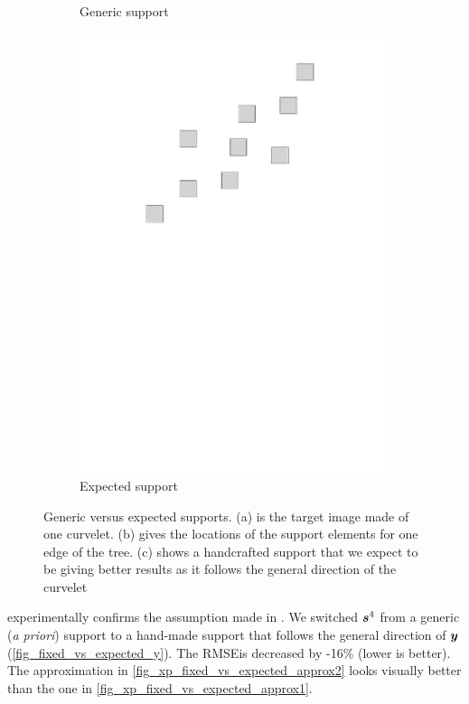 \begin{figure}[!ht]
\begin{subfigure}[b]{0.32\textwidth}
	\caption{Generic support}
\end{subfigure}
\begin{subfigure}[b]{0.32\textwidth}\centering
	\includegraphics[width=\textwidth]{figures/manual-better-support/support-better.pdf}
	\caption{Expected support}
\end{subfigure}
\caption{Generic versus expected supports. (a) is the target image made of one curvelet. (b) gives the locations of the support elements for one edge of the tree. (c) shows a handcrafted support that we expect to be giving better results as it follows the general direction of the curvelet}\label{fig_fixed_vs_expected}
\end{figure}

 experimentally confirms the assumption made in . We switched $\bm{s}^4$ from a generic (\textit{a priori}) support to a hand-made support that follows the general direction of $\bm{y}$ (\cref{fig_fixed_vs_expected_y}). The RMSE\footnotemark[1] is decreased by -16\% (lower is better). The approximation in \cref{fig_xp_fixed_vs_expected_approx2} looks visually better than the one in \cref{fig_xp_fixed_vs_expected_approx1}.

